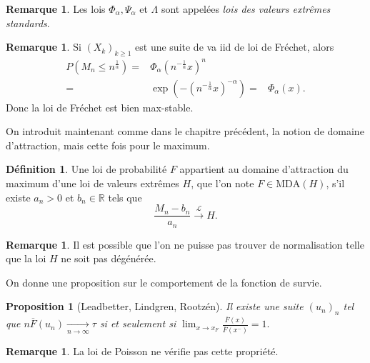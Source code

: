 \documentclass[10p,a4paper,reqno,titlepage]{report}
\newcommand{\R}{\mathbb{R}}
\newcounter{dader}[chapter]
\theoremstyle{plain}
\newtheorem{prop}[prop]{Proposition}
\theoremstyle{definition}
\newtheorem{de}[de]{Définition}
\newtheorem{rem}[dader]{Remarque}
\newcommand{\cvloi}{\stackrel{\mathcal{L}}{\longrightarrow}}
\begin{document}
\begin{rem}
	Les lois $\Phi_\alpha, \Psi_\alpha$ et $\Lambda$ sont appelées \textit{lois des valeurs extrêmes standards}.
\end{rem}
\begin{rem}
	Si $(X_k)_{k \geq 1}$ est une suite de va iid de loi de Fréchet, alors 
	\begin{align*}
		P(M_n \leq n ^{\tfrac{1}{\alpha}}) = & \Phi_\alpha (n^{-\tfrac{1}{\alpha}} x)^n \\
		= & \exp(- (n^{-\tfrac{1}{\alpha}} x)^{-\alpha})
		= & \Phi_\alpha(x).
	\end{align*}
Donc la loi de Fréchet est bien max-stable.
\end{rem}
On introduit maintenant comme dans le chapitre précédent, la notion de domaine d'attraction, mais cette fois pour le maximum.
\begin{de}
	Une loi de probabilité $F$ appartient au domaine d'attraction du maximum d'une loi de valeurs extrêmes $H$, que l'on note $ F \in \mathrm{MDA} (H)$, s'il existe $a_n >0$ et $b_n \in \R$ tels que 
	$$ \frac{M_n -b_n}{a_n} \cvloi H .$$
\end{de}
\begin{rem}
	Il est possible que l'on ne puisse pas trouver de normalisation telle que la loi $H$ ne soit pas dégénérée.
\end{rem}
On donne une proposition sur le comportement de la fonction de survie.
\begin{prop}[Leadbetter, Lindgren, Rootzén]\label{LLR}
	Il existe une suite $(u_n)_n$ tel que $ n \overline{F}(u_n) \underset{n\to \infty}{\longrightarrow} \tau$ si et seulement si $ \lim_{x \to x_F} \frac{\overline{F}(x)}{\overline{F}(x^- )}=1.$
\end{prop}
\begin{rem}
	La loi de Poisson ne vérifie pas cette propriété.
\end{rem}
\end{document}
